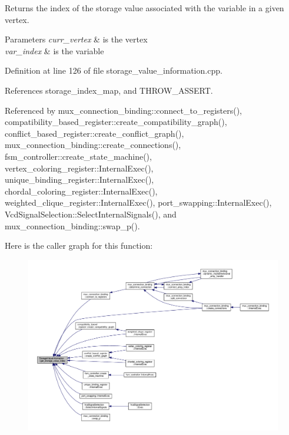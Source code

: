 Returns the index of the storage value associated with the variable in a given vertex. 


\begin{DoxyParams}{Parameters}
{\em curr\+\_\+vertex} & is the vertex \\
\hline
{\em var\+\_\+index} & is the variable \\
\hline
\end{DoxyParams}


Definition at line 126 of file storage\+\_\+value\+\_\+information.\+cpp.



References storage\+\_\+index\+\_\+map, and T\+H\+R\+O\+W\+\_\+\+A\+S\+S\+E\+RT.



Referenced by mux\+\_\+connection\+\_\+binding\+::connect\+\_\+to\+\_\+registers(), compatibility\+\_\+based\+\_\+register\+::create\+\_\+compatibility\+\_\+graph(), conflict\+\_\+based\+\_\+register\+::create\+\_\+conflict\+\_\+graph(), mux\+\_\+connection\+\_\+binding\+::create\+\_\+connections(), fsm\+\_\+controller\+::create\+\_\+state\+\_\+machine(), vertex\+\_\+coloring\+\_\+register\+::\+Internal\+Exec(), unique\+\_\+binding\+\_\+register\+::\+Internal\+Exec(), chordal\+\_\+coloring\+\_\+register\+::\+Internal\+Exec(), weighted\+\_\+clique\+\_\+register\+::\+Internal\+Exec(), port\+\_\+swapping\+::\+Internal\+Exec(), Vcd\+Signal\+Selection\+::\+Select\+Internal\+Signals(), and mux\+\_\+connection\+\_\+binding\+::swap\+\_\+p().

Here is the caller graph for this function\+:
\nopagebreak
\begin{figure}[H]
\begin{center}
\leavevmode
\includegraphics[width=350pt]{d8/dbe/classStorageValueInformation_a03f6c3fab2ebcf00fd56fda4b32194a2_icgraph}
\end{center}
\end{figure}
\mbox{\label{classStorageValueInformation_aba9fe8ab9e8d87fc8b58d470b7c8f6f5}} 

